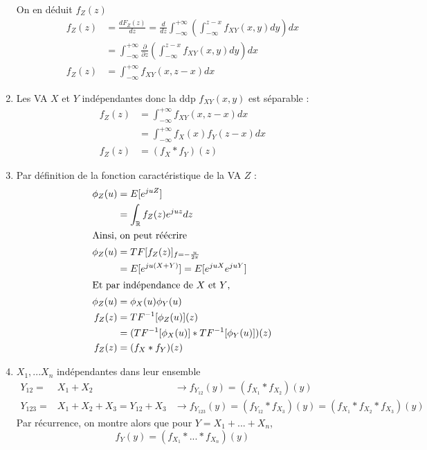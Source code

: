 \documentclass[main.tex]{subfiles}
\begin{document}
\begin{enumerate}
\begin{center}
\end{center}

On en déduit $f_Z(z)$ 
\begin{align*}
f_Z(z) & = \frac{dF_Z(z)}{dz} =  \frac{d}{dz} \int_ {-\infty}^{+\infty} ( \int_{-\infty}^{z-x} f_{XY}(x,y)dy)dx \\
& = \int_ {-\infty}^{+\infty} \frac{\partial}{\partial z} ( \int_{-\infty}^{z-x} f_{XY}(x,y)dy)dx \\
f_Z(z) & = \int_ {-\infty}^{+\infty} f_{XY}(x,z-x)dx
\end{align*}

\item Les VA $X$ et $Y$ indépendantes donc la ddp $f_{XY}(x,y)$ est séparable :
\begin{align*}
f_Z(z) & = \int_ {-\infty}^{+\infty} f_{XY}(x,z-x)dx \\
 & = \int_{-\infty}^{+\infty} f_X(x)f_Y(z-x)dx \\
f_Z(z) & = (f_X * f_Y)(z)
\end{align*}

\item Par définition de la fonction caractéristique de la VA $Z$ :
\begin{align*}
\phi_Z(u) & = E[e^{juZ}] \\
& = \int_{\mathbb{R}} f_Z(z) e^{juz} dz \\
\intertext{Ainsi, on peut réécrire }
\phi_Z(u) & = TF[f_Z(z)]_{f=-\frac{u}{2\pi}} \\
& = E[e^{ju(X+Y)}] = E[e^{juX}e^{juY}] \\
\intertext{Et par indépendance de $X$ et $Y$,}
\phi_Z(u) & = \phi_X(u)\phi_Y(u) \\
f_Z(z) &  = TF^{-1}[\phi_Z(u)](z) \\
& = (TF^{-1}[\phi_X(u)] * TF^{-1}[\phi_Y(u)])(z) \\
f_Z(z) & =(f_X * f_Y)(z)
\end{align*}

\item $X_1,...X_n$ indépendantes dans leur ensemble 
\begin{eqnarray*}
Y_{12} = & X_1 + X_2 & \rightarrow f_{Y_{12}}(y) = (f_{X_1}*f_{X_2})(y) \\
Y_{123} = & X_1 + X_2 + X_3 = Y_{12} + X_3 & \rightarrow f_{Y_{123}}(y) = (f_{Y_{12}} * f_{X_3})(y) = (f_{X_1}*f_{X_2}*f_{X_3})(y)
\end{eqnarray*}
Par récurrence, on montre alors que pour $Y = X_1 + ... + X_n$,
\[f_Y(y) = (f_{X_1}* ... * f_{X_n})(y) \]



\end{enumerate}
\end{document}
